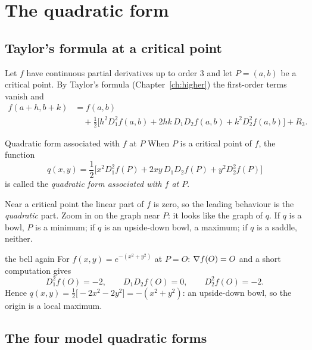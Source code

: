 \section{The quadratic form}

\subsection{Taylor's formula at a critical point}

Let $f$ have continuous partial derivatives up to order $3$ and let $P=(a,b)$ be a critical
point. By Taylor's formula (Chapter~\ref{ch:higher}) the first-order terms vanish and
\begin{align*}
f(a+h,b+k)&=f(a,b)\\&\quad+\frac12\Big[h^2D_1^2f(a,b)+2hk\,D_1D_2f(a,b)+k^2D_2^2f(a,b)\Big]+R_3 .
\end{align*}

\begin{definition}{Quadratic form associated with $f$ at $P$}
When $P$ is a critical point of $f$, the function
\[ q(x,y)=\frac12\Big[x^2D_1^2f(P)+2xy\,D_1D_2f(P)+y^2D_2^2f(P)\Big] \]
is called the \emph{quadratic form associated with $f$ at $P$}.
\end{definition}


\begin{intuition}
Near a critical point the linear part of $f$ is zero, so the leading behaviour is the
\emph{quadratic} part. Zoom in on the graph near $P$: it looks like the graph of $q$. If $q$
is a bowl, $P$ is a minimum; if $q$ is an upside-down bowl, a maximum; if $q$ is a saddle,
neither.
\end{intuition}

\begin{example}{the bell again}
For $f(x,y)=e^{-(x^2+y^2)}$ at $P=O$: $\nabla f(O)=O$ and a short computation gives
\[ D_1^2f(O)=-2,\qquad D_1D_2f(O)=0,\qquad D_2^2f(O)=-2 . \]
Hence $q(x,y)=\tfrac12\big[-2x^2-2y^2\big]=-(x^2+y^2)$: an upside-down bowl, so the origin is a
local maximum.
\end{example}

\subsection{The four model quadratic forms}

